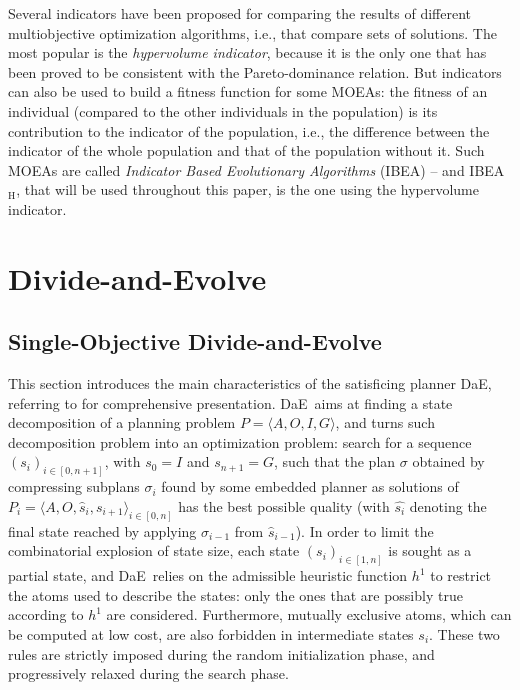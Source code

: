 \documentclass{article}
\def\DAE{{\sc DaE}}
\def\IBEAH{{\sc IBEA$_{\text{H}}$}}
\begin{document}
Several indicators have been proposed for comparing the results of different multiobjective optimization algorithms, i.e., that compare sets of solutions. The most popular is the {\em hypervolume indicator}, because it is the only one that has been proved to be consistent with the Pareto-dominance relation. But indicators can also be used to build a fitness function for some MOEAs: the fitness of an individual (compared to the other individuals in the population) is its contribution to the indicator of the population, i.e., the difference between the indicator of the whole population and that of the population without it. Such MOEAs are called {\em Indicator Based Evolutionary Algorithms} (IBEA) \cite{Zitzler2004} -- and \IBEAH, that will be used throughout this paper, is the one using the hypervolume indicator.


\section{Divide-and-Evolve}
\label{sec:DAE}

\subsection{Single-Objective Divide-and-Evolve}
This section introduces the main characteristics of the satisficing planner \DAE, referring to \cite{Bibai2010} for  comprehensive presentation.
\DAE\ aims at finding a state decomposition of a planning problem $P=\langle A, O, I, G\rangle$, and turns such decomposition problem into an optimization problem: search for a sequence $(s_i)_{i\in [0,n+1]}$, with $s_0=I$ and $s_{n+1}=G$, such that the plan $\sigma$ obtained by compressing subplans $\sigma_i$ found by some embedded planner as solutions of $P_i=\langle A, O, \hat{s}_i, s_{i+1}\rangle_{i\in[0, n]}$ has the best possible quality (with $\hat{s_i}$ denoting the final state reached by applying $\sigma_{i-1}$ from $\hat{s}_{i-1}$). In order to limit the combinatorial explosion of state size, each state $(s_i)_{i\in [1,n]}$ is sought as a partial state, and \DAE\ relies on the admissible heuristic function $h^1$ \cite{HaslumGeffner-AIPS-2000} to restrict the atoms used to describe the states: only the ones that are possibly true according to $h^1$ are considered. Furthermore, mutually exclusive atoms, which can be computed at low cost, are also forbidden in intermediate states $s_i$. These two 
rules are 
strictly imposed during the 
random initialization phase, and progressively relaxed during the search phase. 
\end{document}
